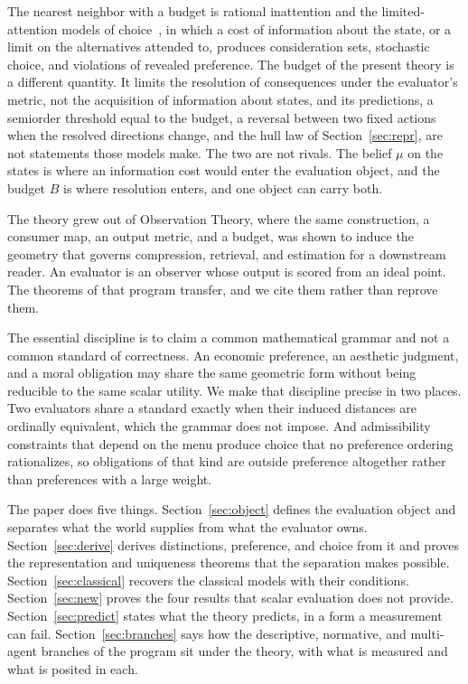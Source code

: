 \documentclass[11pt]{article}
\theoremstyle{definition}
\theoremstyle{remark}
\begin{document}
The nearest neighbor with a budget is rational inattention and the limited-attention models of choice~\cite{sims2003,caplin2015,masatlioglu2012,matejka2015}, in which a cost of information about the state, or a limit on the alternatives attended to, produces consideration sets, stochastic choice, and violations of revealed preference.
The budget of the present theory is a different quantity.
It limits the resolution of consequences under the evaluator's metric, not the acquisition of information about states, and its predictions, a semiorder threshold equal to the budget, a reversal between two fixed actions when the resolved directions change, and the hull law of Section~\ref{sec:repr}, are not statements those models make.
The two are not rivals.
The belief $\mu$ on the states is where an information cost would enter the evaluation object, and the budget $B$ is where resolution enters, and one object can carry both.

The theory grew out of Observation Theory, where the same construction, a consumer map, an output metric, and a budget, was shown to induce the geometry that governs compression, retrieval, and estimation for a downstream reader.
An evaluator is an observer whose output is scored from an ideal point.
The theorems of that program transfer, and we cite them rather than reprove them.

The essential discipline is to claim a common mathematical grammar and not a common standard of correctness.
An economic preference, an aesthetic judgment, and a moral obligation may share the same geometric form without being reducible to the same scalar utility.
We make that discipline precise in two places.
Two evaluators share a standard exactly when their induced distances are ordinally equivalent, which the grammar does not impose.
And admissibility constraints that depend on the menu produce choice that no preference ordering rationalizes, so obligations of that kind are outside preference altogether rather than preferences with a large weight.

The paper does five things.
Section~\ref{sec:object} defines the evaluation object and separates what the world supplies from what the evaluator owns.
Section~\ref{sec:derive} derives distinctions, preference, and choice from it and proves the representation and uniqueness theorems that the separation makes possible.
Section~\ref{sec:classical} recovers the classical models with their conditions.
Section~\ref{sec:new} proves the four results that scalar evaluation does not provide.
Section~\ref{sec:predict} states what the theory predicts, in a form a measurement can fail.
Section~\ref{sec:branches} says how the descriptive, normative, and multi-agent branches of the program sit under the theory, with what is measured and what is posited in each.
\end{document}
